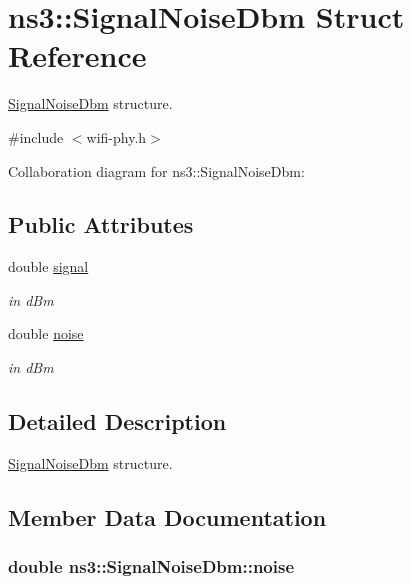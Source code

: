 \hypertarget{structns3_1_1SignalNoiseDbm}{}\section{ns3\+:\+:Signal\+Noise\+Dbm Struct Reference}
\label{structns3_1_1SignalNoiseDbm}


\hyperlink{structns3_1_1SignalNoiseDbm}{Signal\+Noise\+Dbm} structure.  




{\ttfamily \#include $<$wifi-\/phy.\+h$>$}



Collaboration diagram for ns3\+:\+:Signal\+Noise\+Dbm\+:
\subsection*{Public Attributes}
\begin{DoxyCompactItemize}
\item 
double \hyperlink{structns3_1_1SignalNoiseDbm_ab40070893b526511063eee33602eb442}{signal}
\begin{DoxyCompactList}\small\item\em in d\+Bm \end{DoxyCompactList}\item 
double \hyperlink{structns3_1_1SignalNoiseDbm_aa2bfe5d86d74eb9fa6347a850b9d1e8e}{noise}
\begin{DoxyCompactList}\small\item\em in d\+Bm \end{DoxyCompactList}\end{DoxyCompactItemize}


\subsection{Detailed Description}
\hyperlink{structns3_1_1SignalNoiseDbm}{Signal\+Noise\+Dbm} structure. 

\subsection{Member Data Documentation}
\subsubsection[{\texorpdfstring{noise}{noise}}]{\setlength{\rightskip}{0pt plus 5cm}double ns3\+::\+Signal\+Noise\+Dbm\+::noise}\hypertarget{structns3_1_1SignalNoiseDbm_aa2bfe5d86d74eb9fa6347a850b9d1e8e}{}\label{structns3_1_1SignalNoiseDbm_aa2bfe5d86d74eb9fa6347a850b9d1e8e}


